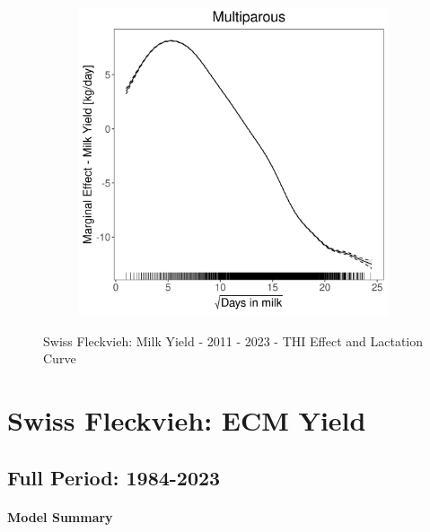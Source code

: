 \begin{figure}[H]
\begin{subfigure}[b]{0.45\textwidth}
    \end{subfigure}
    \hspace{0.05\textwidth} %
    \begin{subfigure}[b]{0.45\textwidth}
        \centering
        \includegraphics[width=\textwidth]{thesis/figures/models/milk/after2010/sf_milk_after2010/sf_milk_after2010_marginal_dim_milk_multi.png}
    \end{subfigure}
    \caption[]{Swiss Fleckvieh: Milk Yield - 2011 - 2023 - THI Effect and Lactation Curve}
    \label{fig:main}
\end{figure}

\section{Swiss Fleckvieh: ECM Yield}
\subsection{Full Period: 1984-2023}\label{model:sf_ecm_full}
\paragraph{Model Summary} \quad \\

